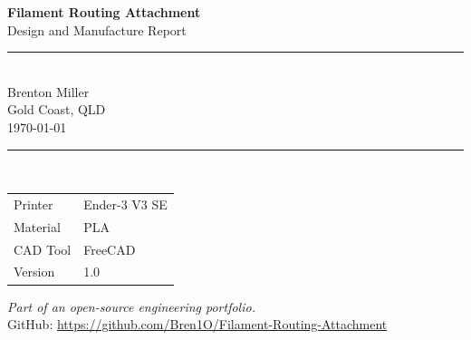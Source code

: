 \documentclass[12pt, a4paper]{article}
\def\Printername{Ender-3 V3 SE} %
\begin{document}
\begin{titlepage}
    \centering
    \vspace*{40mm}

    {\LARGE \textbf{Filament Routing Attachment}}\\[4mm]
    {\large Design and Manufacture Report}\\[10mm]

    \rule{0.5\textwidth}{0.4pt}\\[8mm]

    {\large Brenton Miller}\\[2mm]
    {\normalsize Gold Coast, QLD}\\[2mm]
    {\normalsize \today}\\[10mm]

    \rule{0.5\textwidth}{0.4pt}\\[8mm]

    {\small
        \begin{tabular}{ll}
            Printer   & \Printername    \\
            Material  & PLA   \\
            CAD Tool  & FreeCAD  \\
            Version   & 1.0                \\
        \end{tabular}
    }

    \vfill
    {\small \textit{Part of an open-source engineering portfolio.}\\
    GitHub: \url{https://github.com/Bren1O/Filament-Routing-Attachment}}
\end{titlepage}


















\printbibliography
\end{document}
